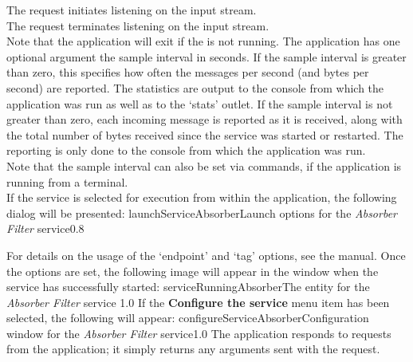 The  request initiates listening
on the input stream.\\

The  request terminates listening
on the input stream.\\

Note that the application will exit if the  is not
running.
\condPage{}
The application has one optional argument \longDash{} the sample interval in seconds.
If the sample interval is greater than zero, this specifies how often the messages per
second (and bytes per second) are reported.
The statistics are output to the console from which the application was run as well as to
the `stats' outlet.
If the sample interval is not greater than zero, each incoming message is reported as it
is received, along with the total number of bytes received since the service was started
or restarted.
The reporting is only done to the console from which the application was run.
\insertAppParameters
{}
\insertFilterServiceComment\\

Note that the sample interval can also be set via commands, if the application is
running from a terminal.\\

\insertStandardServiceCommands
\condPage
If the service is selected for execution from within the \emph{\MMMU} application, the
following dialog will be presented:
%
{launchServiceAbsorber}{Launch options for the \emph{Absorber Filter} service}{0.8}

For details on the usage of the `endpoint' and `tag' options, see the \emph{\MMMU} manual.
Once the options are set, the following image will appear in the \emph{\MMMU} window when
the service has successfully started:
%
{serviceRunningAbsorber}{The \emph{\MMMU} entity for the \emph{Absorber Filter} service}%
{1.0}
\condPage{}
If the \textbf{Configure the service} menu item has been selected, the following will
appear:
%
{configureServiceAbsorber}{Configuration window for the \emph{Absorber Filter}
service}{1.0}
The  application responds to
 requests from the
 application; it simply returns any arguments
sent with the request.\\

